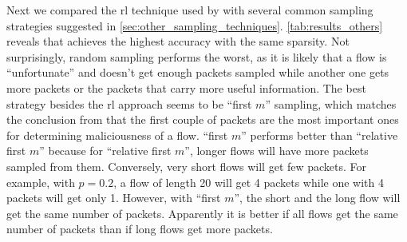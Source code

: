 \documentclass[conference]{IEEEtran}
\begin{document}
Next we compared the \gls{rl} technique used by \ours{} with several common sampling strategies suggested in \autoref{sec:other_sampling_techniques}.
\autoref{tab:results_others} reveals that \ours{} achieves the highest accuracy with the same sparsity. Not surprisingly, random sampling performs the worst, as it is likely that a flow is ``unfortunate'' and doesn't get enough packets sampled while another one gets more packets or the packets that carry more useful information. The best strategy besides the \gls{rl} approach seems to be ``first $m$'' sampling, which matches the conclusion from \cite{hartl_explainability_2020} that the first couple of packets are the most important ones for determining maliciousness of a flow.
``first $m$'' performs better than ``relative first $m$'' because for ``relative first $m$'', longer flows will have more packets sampled from them. Conversely, very short flows will get few packets. For example, with $p=0.2$, a flow of length 20 will get 4 packets while one with 4 packets will get only 1. However, with ``first $m$'', the short and the long flow will get the same number of packets. Apparently it is better if all flows get the same number of packets than if long flows get more packets. 
\end{document}
